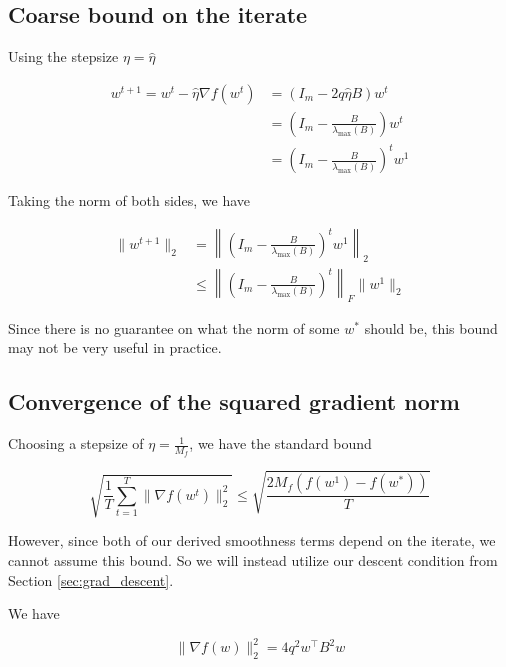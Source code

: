 \documentclass[11pt]{article}
\begin{document}
\subsection{Coarse bound on the iterate}

Using the stepsize $\eta = \hat{\eta}$

\begin{align*}
    w^{t+1} = w^t - \hat{\eta} \nabla f(w^t)
    &= (I_m - 2q \hat{\eta} B)w^t \\
    &= \left( I_m - \frac{B}{\lambda_{\max}(B)} \right) w^t \\
    &= \left( I_m - \frac{B}{\lambda_{\max}(B)} \right)^t w^1
\end{align*}

Taking the norm of both sides, we have

\begin{align*}
    \|w^{t+1}\|_2 &= \left\|\left( I_m - \frac{B}{\lambda_{\max}(B)} \right)^t w^1 \right\|_2 \\
    &\leq \left\|\left( I_m - \frac{B}{\lambda_{\max}(B)} \right)^t \right\|_F \|w^1\|_2
\end{align*}

Since there is no guarantee on what the norm of some $w^*$ should be, this bound may not be very useful in practice.

\subsection{Convergence of the squared gradient norm}


Choosing a stepsize of $\eta = \frac{1}{M_f}$, we have the standard bound

\begin{equation}
    \sqrt{\frac{1}{T} \sum_{t=1}^{T} \| \nabla f(w^t) \|_2^2} \leq \sqrt{\frac{2 M_f (f(w^1) - f(w^*))}{T}}
\end{equation}

However, since both of our derived smoothness terms depend on the iterate, we cannot assume this bound. So we will instead utilize our descent condition from Section \ref{sec:grad_descent}.

We have

\begin{equation}
    \| \nabla f(w) \|_2^2 = 4 q^2 w^{\top} B^2 w
\end{equation}
\end{document}
